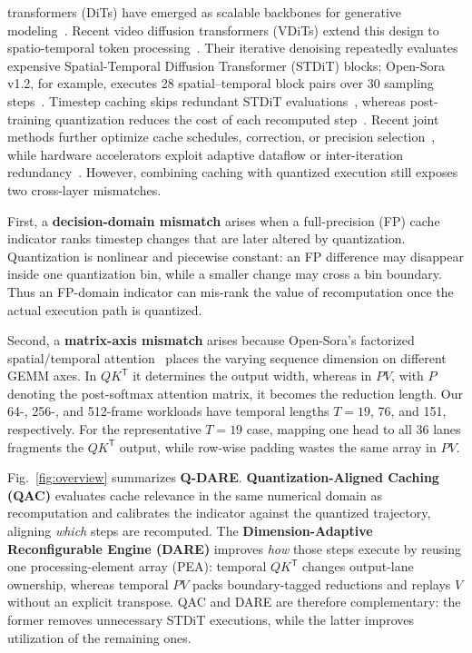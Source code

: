 \documentclass[conference]{IEEEtran}
\begin{document}
 transformers (DiTs) have emerged as scalable
backbones for generative modeling~\cite{peebles2023dit}.
Recent video diffusion transformers (VDiTs) extend this design to
spatio-temporal token processing~\cite{ma2025latte,zheng2024opensora}.
Their iterative denoising repeatedly evaluates expensive
Spatial-Temporal Diffusion Transformer (STDiT) blocks; Open-Sora v1.2,
for example, executes 28 spatial--temporal block pairs over 30 sampling
steps~\cite{zheng2024opensora}. Timestep caching skips redundant STDiT evaluations~\cite{liu2025teacache}, whereas post-training quantization reduces the cost of each recomputed step~\cite{zhao2025viditq}. Recent joint methods further optimize cache schedules, correction, or precision selection~\cite{liu2025cachequant,wu2025quantcache}, while hardware accelerators exploit adaptive dataflow or inter-iteration redundancy~\cite{ding2025vida, kim2025ditto, heo2025exion}. However, combining caching with quantized execution still exposes two cross-layer mismatches.


First, a \textbf{decision-domain mismatch} arises when a full-precision (FP) cache indicator ranks timestep changes that are later altered by quantization. Quantization is nonlinear and piecewise constant: an FP difference may disappear inside one quantization bin, while a smaller change may cross a bin boundary. Thus an FP-domain indicator can mis-rank the value of recomputation once the actual execution path is quantized.

Second, a \textbf{matrix-axis mismatch} arises because Open-Sora's factorized spatial/temporal attention~\cite{zheng2024opensora} places the varying sequence dimension on different GEMM axes. In $QK^{\mathsf T}$ it determines the output width, whereas in $PV$, with $P$ denoting the post-softmax attention matrix, it becomes the reduction length. Our 64-, 256-, and 512-frame workloads have temporal lengths $T=19$, 76, and 151, respectively. For the representative $T=19$ case, mapping one head to all 36 lanes fragments the $QK^{\mathsf T}$ output, while row-wise padding wastes the same array in $PV$.

Fig.~\ref{fig:overview} summarizes \textbf{Q-DARE}.
\textbf{Quantization-Aligned Caching (QAC)} evaluates cache relevance
in the same numerical domain as recomputation and calibrates the
indicator against the quantized trajectory, aligning \emph{which}
steps are recomputed. The
\textbf{Dimension-Adaptive Reconfigurable Engine (DARE)} improves
\emph{how} those steps execute by reusing one processing-element
array (PEA): temporal $QK^{\mathsf T}$ changes output-lane ownership,
whereas temporal $PV$ packs boundary-tagged reductions and replays
$V$ without an explicit transpose. QAC and DARE are therefore complementary: the former removes unnecessary STDiT executions, while the latter improves utilization of the remaining ones.
\end{document}
